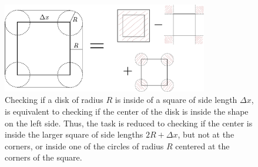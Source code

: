 \documentclass{article}
\begin{document}
    \begin{figure}[H]
        \centering
        \includegraphics[width=0.8\textwidth]{figure.pdf}
        \caption{Checking if a disk of radius $R$ is inside of a square of side length $\Delta x$, is equivalent to checking if the center of the disk is inside the shape on the left side.
        Thus, the task is reduced to checking if the center is inside the larger square of side lengths $2R + \Delta x$, but not at the corners, or inside one of the circles of radius $R$ centered at the corners of the square.}
        \label{check if disk is inside}
    \end{figure}
\end{document}
